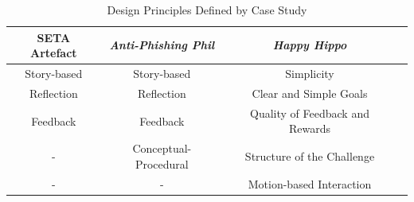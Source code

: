 \documentclass[conference]{IEEEtran}
\begin{document}
\begin{table}[h]
\caption{Design Principles Defined by Case Study \cite{Dincelli2020,Sheng2007,allers2021children}}
\begin{adjustwidth}{-0.6cm}{}
\begin{tabular}{|c|c|c|c|}
\hline

\textbf{SETA Artefact} & \textbf{\textit{Anti-Phishing Phil}}& \textbf{\textit{Happy Hippo}} \\
\hline
Story-based	& Story-based 			& Simplicity  \\
Reflection	& Reflection			& Clear and Simple Goals  \\
Feedback	& Feedback 				& Quality of Feedback and Rewards  \\
	-		& Conceptual-Procedural	& Structure of the Challenge  \\
	-		& 		-				& Motion-based Interaction  \\
\hline

\end{tabular}
\label{tab1}
\end{adjustwidth}
\end{table}
\end{document}
